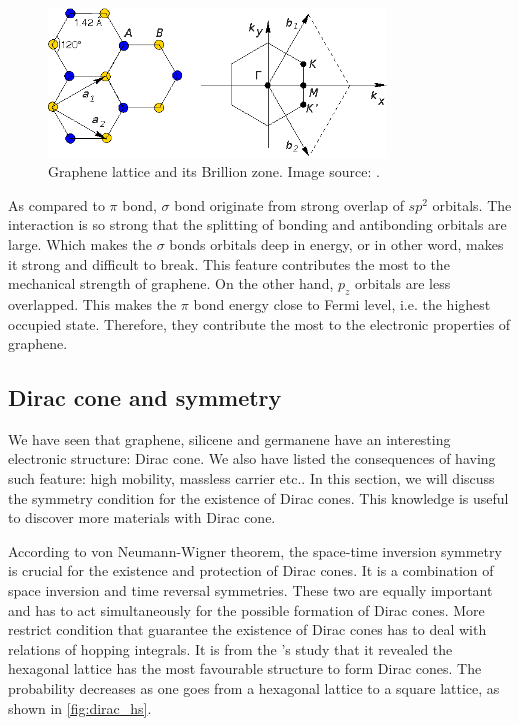 \begin{figure}[htbp!] 
\centering  
\includegraphics[width=0.8\textwidth]{gra_lat.eps}
\caption{Graphene lattice and its Brillion zone. Image source: \cite{CastroNeto2009}. }  
\label{fig:gra_lat}
\end{figure} 

As compared to $\pi$ bond, $\sigma$ bond originate from strong overlap of $sp^2$ orbitals. The interaction is so strong that the splitting of bonding and antibonding orbitals are large. Which makes the $\sigma$ bonds orbitals deep in energy, or in other word, makes it strong and difficult to break. This feature contributes the most to the mechanical strength of graphene. On the other hand, $p_z$ orbitals are less overlapped. This makes the $\pi$ bond energy close to Fermi level, i.e. the highest occupied state. Therefore, they contribute the most to the electronic properties of graphene.  


\subsection{Dirac cone and symmetry}

We have seen that graphene, silicene and germanene have an interesting electronic structure: Dirac cone. We also have listed the consequences of having such feature: high mobility, massless carrier etc.. In this section, we will discuss the symmetry condition for the existence of Dirac cones. This knowledge is useful to discover more materials with Dirac cone. 

According to von Neumann-Wigner theorem, the space-time inversion symmetry is crucial for the existence and protection of Dirac cones\cite{Wang2015b}. It is a combination of space inversion and time reversal symmetries. These two are equally important and has to act simultaneously for the possible formation of Dirac cones. More restrict condition that guarantee the existence of Dirac cones has to deal with relations of hopping integrals\cite{Hasegawa2006,Liu2013}. It is from the \citet{Liu2013}'s study that it revealed the hexagonal lattice has the most favourable structure to form Dirac cones. The probability decreases as one goes from a hexagonal lattice to a square lattice, as shown in \autoref{fig:dirac_hs}.

